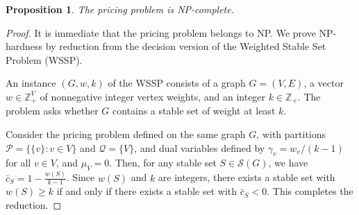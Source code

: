 \documentclass[preprint, 11pt, authoryear]{elsarticle}
\newtheorem{proposition}{Proposition}[section]
\newcommand{\PP}{{\mathcal P}}
\newcommand{\QQ}{{\mathcal Q}}
\newcommand{\STAB}{{\mathscr S}}
\begin{document}
\begin{proposition}
The pricing problem is NP-complete.
\end{proposition}

\begin{proof}
It is immediate that the pricing problem belongs to NP. We prove NP-hardness by reduction from the decision version of the Weighted Stable Set Problem (WSSP).

An instance $(G,w,k)$ of the WSSP consists of a graph $G=(V,E)$, a vector $w \in \mathbb{Z}_+^V$ of nonnegative integer vertex weights, and an integer $k \in \mathbb{Z}_+$. The problem asks whether $G$ contains a stable set of weight at least $k$.

Consider the pricing problem defined on the same graph $G$, with partitions $\PP = \{\{v\} : v \in V\}$ and $\QQ = \{V\}$, and dual variables defined by $\gamma_v = w_v/(k-1)$ for all $v \in V$, and $\mu_V = 0$.
Then, for any stable set $S \in \STAB(G)$, we have
$\bar{c}_S = 1 - \frac{w(S)}{k-1}$.
Since $w(S)$ and $k$ are integers, there exists a stable set with $w(S) \ge k$ if and only if there exists a stable set with $\bar{c}_S < 0$. This completes the reduction.
\end{proof}


\end{document}
